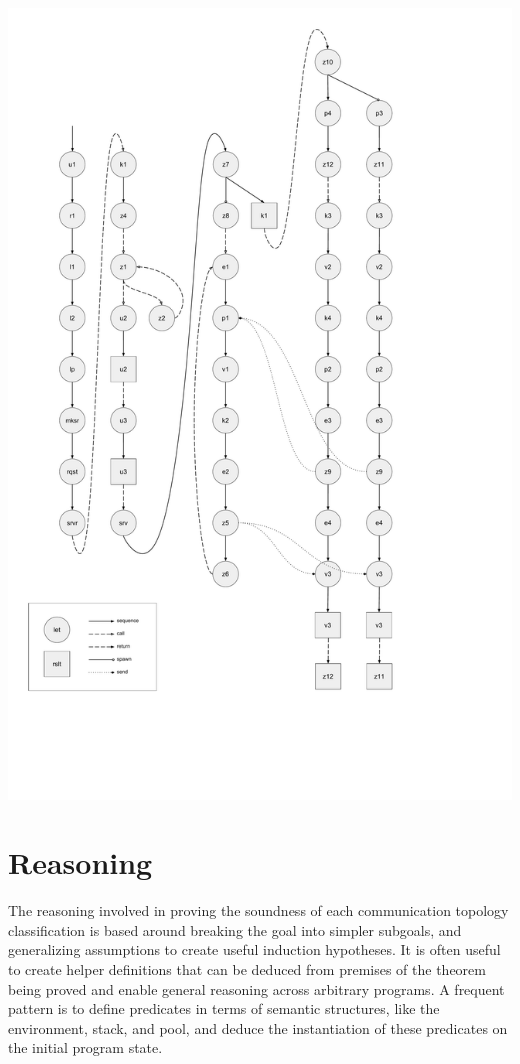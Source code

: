 \documentclass{article}
\begin{document}
\includegraphics[width=1.0\textwidth, left]{cml_graph.pdf}

\section{Reasoning}
The reasoning involved in proving the soundness of each communication topology classification
is based around breaking the goal into simpler subgoals, and generalizing assumptions to create
useful induction hypotheses.  It is often useful to
create helper definitions that can be deduced
from premises of the theorem being proved and enable
general reasoning across arbitrary programs.
A frequent pattern is to define
predicates in terms of semantic structures, like the environment, stack, and pool, and deduce 
the instantiation of these predicates on the initial program state. 
\end{document}
